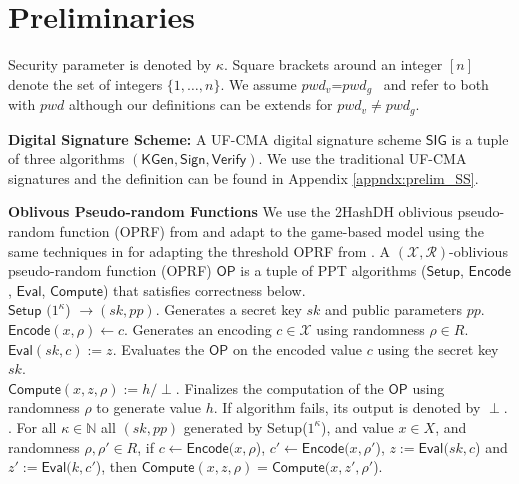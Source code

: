 \documentclass[conference]{IEEEtran}
\newcommand{\secparameter}{\kappa}
\newcommand{\pwg}{$pwd_g$}
\newcommand{\pwv}{$pwd_v$}
\newcommand{\pwd}{pwd}
\begin{document}
\section{Preliminaries}
\label{sec:preliminaries}

Security parameter is denoted by $\secparameter$. Square brackets around an integer $[n]$ denote the set of integers $\{1,\ldots,n\}$. We assume \pwv=\pwg~ and refer to both with $\pwd$ although our definitions can be extends for \pwv$\neq$\pwg.
%

\noindent
{\bf Digital Signature Scheme:} A UF-CMA digital signature scheme $\mathsf{SIG}$ is a tuple of three algorithms $(\mathsf{KGen}, \mathsf{Sign}, \mathsf{Verify})$. We use the traditional UF-CMA signatures \cite{10.1137/0217017} and the definition can be found in Appendix \ref{appndx:prelim_SS}.

\noindent
{\bf Oblivous Pseudo-random Functions}
We use the 2HashDH oblivious pseudo-random function (OPRF) from \cite{7467360} and adapt to the game-based model using the same techniques in \cite{PASTA-Agrawal} for adapting the threshold OPRF from \cite{Jarecki2017TOPPSSCP}. A $(\mathcal{X},\mathcal{R})$-oblivious pseudo-random function (OPRF) $\mathsf{OP}$ is a tuple of PPT algorithms ($\mathsf{Setup}$, $\mathsf{Encode}$, $\mathsf{Eval}$, $\mathsf{Compute}$) that satisfies correctness below.
\\
$\mathsf{Setup}$ $(1^{\secparameter}$) $\rightarrow (sk,pp)$. Generates a secret key $sk$ and public parameters $pp$.\\
$\mathsf{Encode}(x,\rho) \leftarrow c$. Generates an encoding $c \in \mathcal{X}$ using randomness $\rho \in R$.\\
$\mathsf{Eval}(sk,c) := z$. Evaluates the $\mathsf{OP}$ on the encoded value $c$ using the secret key $sk$.\\
$\mathsf{Compute}(x,z,\rho) := h/\perp$. Finalizes the computation of the $\mathsf{OP}$ using randomness $\rho$ to generate value $h$. If algorithm fails, its output is denoted by $\perp$.\\
%
. For all $\secparameter \in \mathbb{N}$ all $(sk,pp)$ generated by Setup($1^{\secparameter}$), and value $x \in X$, and randomness $\rho, \rho' \in R$, if $c \leftarrow \mathsf{Encode}(x, \rho$), $c' \leftarrow \mathsf{Encode}(x, \rho'$), $z :=  \mathsf{Eval}(sk, c$) and $z' := \mathsf{Eval}(k,c'$), then $\mathsf{Compute}(x,z,\rho) = \mathsf{Compute}(x, z', \rho'$).
\\
\end{document}
